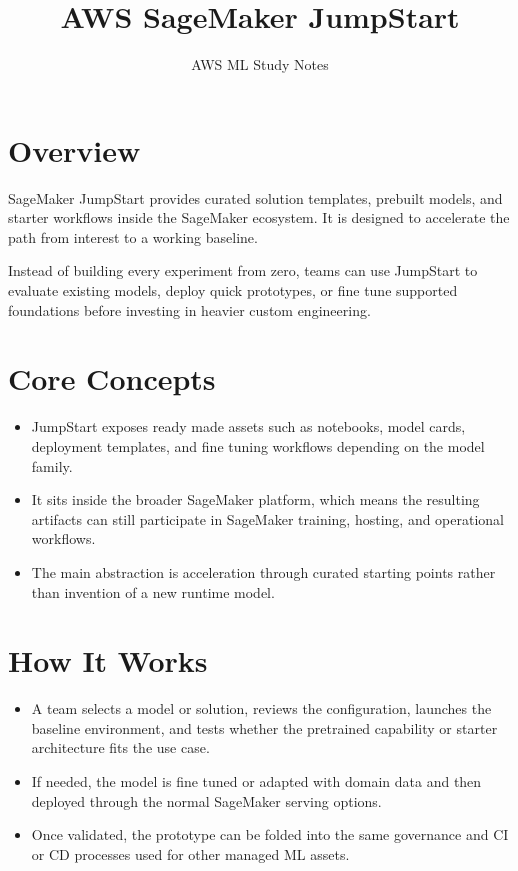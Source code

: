 \documentclass[10pt,twocolumn]{article}
\begin{document}
\title{\vspace{-1.6cm}AWS SageMaker JumpStart}
\author{AWS ML Study Notes}
\date{}
\maketitle
\small

\section*{Overview}
SageMaker JumpStart provides curated solution templates, prebuilt models, and starter workflows inside the SageMaker ecosystem. It is designed to accelerate the path from interest to a working baseline.

Instead of building every experiment from zero, teams can use JumpStart to evaluate existing models, deploy quick prototypes, or fine tune supported foundations before investing in heavier custom engineering.

\section*{Core Concepts}
\begin{itemize}
\item JumpStart exposes ready made assets such as notebooks, model cards, deployment templates, and fine tuning workflows depending on the model family.
\item It sits inside the broader SageMaker platform, which means the resulting artifacts can still participate in SageMaker training, hosting, and operational workflows.
\item The main abstraction is acceleration through curated starting points rather than invention of a new runtime model.
\end{itemize}

\section*{How It Works}
\begin{itemize}
\item A team selects a model or solution, reviews the configuration, launches the baseline environment, and tests whether the pretrained capability or starter architecture fits the use case.
\item If needed, the model is fine tuned or adapted with domain data and then deployed through the normal SageMaker serving options.
\item Once validated, the prototype can be folded into the same governance and CI or CD processes used for other managed ML assets.
\end{itemize}
\end{document}
